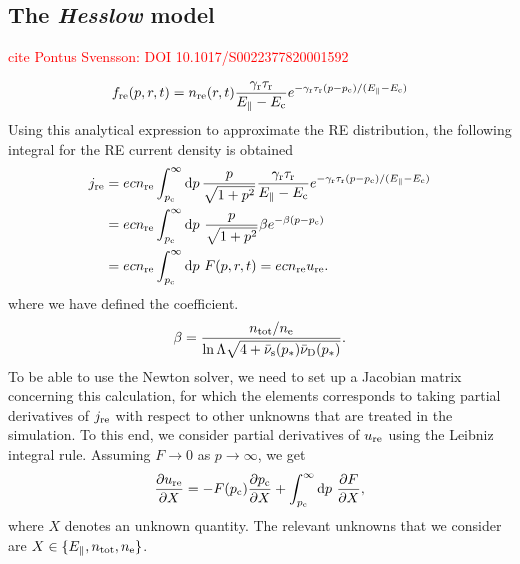 \documentclass{notes}
\newcommand{\jre}{j_{\rm re}}
\newcommand{\nre}{n_{\rm re}}
\newcommand{\fre}{f_{\rm re}}
\newcommand{\ure}{u_{\rm re}}
\newcommand{\pc}{p_{\rm c}}
\newcommand{\lnL}{\ln\Lambda}
\newcommand{\E}{E_\parallel}
\newcommand{\Ec}{E_{\rm c}}
\newcommand{\gava}{\gamma_{\rm r}}
\newcommand{\trel}{\tau_{\rm r}}
\newcommand{\nuS}{\bar{\nu}_{\rm s}}
\newcommand{\nuD}{\bar{\nu}_{\rm D}}
\newcommand{\ntot}{n_{\rm tot}}
\renewcommand{\ne}{n_{\rm e}}
\begin{document}
	\subsection{The \textit{Hesslow} model}
	\textcolor{red}{cite Pontus Svensson: DOI 10.1017/S0022377820001592}

	\begin{equation}
		\label{eq:Hesslow-distribution}
		\fre(p, r, t)
		=\nre(r, t)\frac{\gava\trel}{\E-\Ec} e^{-\gava\trel(p-\pc)/(\E-\Ec)}
	\end{equation}
	Using this analytical expression to approximate the RE distribution, the following integral for the RE current density is obtained
	\begin{align}
		\label{eq:Hesslow-current}
		\jre
		&= ec\nre\int_{\pc}^\infty\dd{p}\frac{p}{\sqrt{1+p^2}} \frac{\gava\trel}{\E-\Ec} e^{-\gava\trel(p-\pc)/(\E-\Ec)}\\
		&=ec\nre\int_{\pc}^\infty\dd{p}\,\frac{p}{\sqrt{1+p^2}}\beta e^{-\beta(p-\pc)}\\
		&=ec\nre\int_{\pc}^\infty\dd{p}\,F(p, r, t)
		=ec\nre\ure.
	\end{align}
	where we have defined the coefficient.
	\begin{equation}
		\beta=\frac{\ntot/\ne}{\lnL\sqrt{4+\nuS(p_*)\nuD(p_*)}}.
	\end{equation}
	To be able to use the Newton solver, we need to set up a Jacobian matrix concerning this calculation, for which the elements corresponds to taking partial derivatives of $\jre$ with respect to other unknowns that are treated in the simulation.
	To this end, we consider partial derivatives of $\ure$ using the Leibniz integral rule.
	Assuming $F\to0$ as $p\to\infty$, we get
	\begin{equation}
			\label{eq:pdv_uqty}
			\pdv{\ure}{X}
			=-F(\pc)\pdv{\pc}{X} + \int_{\pc}^\infty\dd{p}\,\pdv{F}{X},
	\end{equation}
	where $X$ denotes an unknown quantity.
	The relevant unknowns that we consider are $X\in\{\E, \ntot, \ne\}$.
\end{document}

